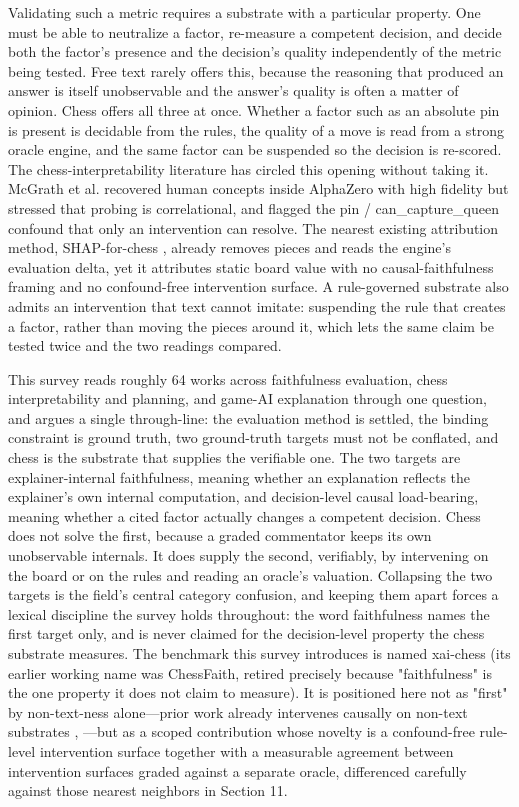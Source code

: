 \documentclass[conference]{IEEEtran}
\begin{document}
Validating such a metric requires a substrate with a particular property. One must be able to neutralize a factor, re-measure a competent decision, and decide both the factor's presence and the decision's quality independently of the metric being tested. Free text rarely offers this, because the reasoning that produced an answer is itself unobservable and the answer's quality is often a matter of opinion. Chess offers all three at once. Whether a factor such as an absolute pin is present is decidable from the rules, the quality of a move is read from a strong oracle engine, and the same factor can be suspended so the decision is re-scored. The chess-interpretability literature has circled this opening without taking it. McGrath et al. \cite{ref1} recovered human concepts inside AlphaZero with high fidelity but stressed that probing is correlational, and flagged the pin / can\_capture\_queen confound that only an intervention can resolve. The nearest existing attribution method, SHAP-for-chess \cite{ref19}, already removes pieces and reads the engine's evaluation delta, yet it attributes static board value with no causal-faithfulness framing and no confound-free intervention surface. A rule-governed substrate also admits an intervention that text cannot imitate: suspending the rule that creates a factor, rather than moving the pieces around it, which lets the same claim be tested twice and the two readings compared.

This survey reads roughly 64 works across faithfulness evaluation, chess interpretability and planning, and game-AI explanation through one question, and argues a single through-line: the evaluation method is settled, the binding constraint is ground truth, two ground-truth targets must not be conflated, and chess is the substrate that supplies the verifiable one. The two targets are explainer-internal faithfulness, meaning whether an explanation reflects the explainer's own internal computation, and decision-level causal load-bearing, meaning whether a cited factor actually changes a competent decision. Chess does not solve the first, because a graded commentator keeps its own unobservable internals. It does supply the second, verifiably, by intervening on the board or on the rules and reading an oracle's valuation. Collapsing the two targets is the field's central category confusion, and keeping them apart forces a lexical discipline the survey holds throughout: the word faithfulness names the first target only, and is never claimed for the decision-level property the chess substrate measures. The benchmark this survey introduces is named xai-chess (its earlier working name was ChessFaith, retired precisely because "faithfulness" is the one property it does not claim to measure). It is positioned here not as "first" by non-text-ness alone---prior work already intervenes causally on non-text substrates \cite{ref32}, \cite{ref19}---but as a scoped contribution whose novelty is a confound-free rule-level intervention surface together with a measurable agreement between intervention surfaces graded against a separate oracle, differenced carefully against those nearest neighbors in Section 11.
\end{document}
